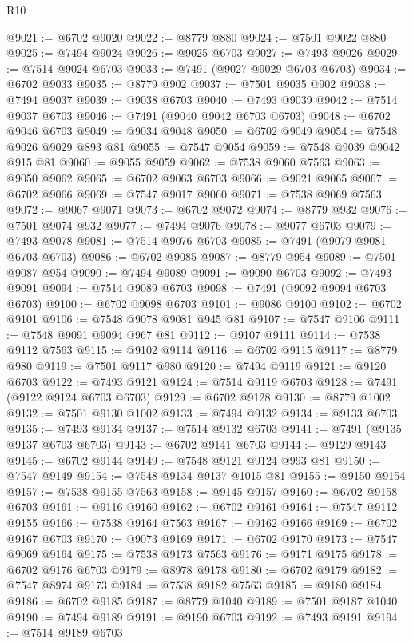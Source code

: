 \begin{lexlean}{R10}
\begin{coremodule}
{{{{{{{{{{{{{{{{{{{{{{{{{{{{{{{{{{{{{{{{{{{{{{{{{{{{{{{{{{{{{{{{{{{{{{{{{{{{{{{{{{{{@9021 := @6702 @9020
@9022 := @8779 @880
@9024 := @7501 @9022 @880
@9025 := @7494 @9024
@9026 := @9025 @6703
@9027 := @7493 @9026
@9029 := @7514 @9024 @6703
@9033 := @7491 (@9027 @9029 @6703 @6703)
@9034 := @6702 @9033
@9035 := @8779 @902
@9037 := @7501 @9035 @902
@9038 := @7494 @9037
@9039 := @9038 @6703
@9040 := @7493 @9039
@9042 := @7514 @9037 @6703
@9046 := @7491 (@9040 @9042 @6703 @6703)
@9048 := @6702 @9046 @6703
@9049 := @9034 @9048
@9050 := @6702 @9049
@9054 := @7548 @9026 @9029 @893 @81
@9055 := @7547 @9054
@9059 := @7548 @9039 @9042 @915 @81
@9060 := @9055 @9059
@9062 := @7538 @9060 @7563
@9063 := @9050 @9062
@9065 := @6702 @9063 @6703
@9066 := @9021 @9065
@9067 := @6702 @9066
@9069 := @7547 @9017 @9060
@9071 := @7538 @9069 @7563
@9072 := @9067 @9071
@9073 := @6702 @9072
@9074 := @8779 @932
@9076 := @7501 @9074 @932
@9077 := @7494 @9076
@9078 := @9077 @6703
@9079 := @7493 @9078
@9081 := @7514 @9076 @6703
@9085 := @7491 (@9079 @9081 @6703 @6703)
@9086 := @6702 @9085
@9087 := @8779 @954
@9089 := @7501 @9087 @954
@9090 := @7494 @9089
@9091 := @9090 @6703
@9092 := @7493 @9091
@9094 := @7514 @9089 @6703
@9098 := @7491 (@9092 @9094 @6703 @6703)
@9100 := @6702 @9098 @6703
@9101 := @9086 @9100
@9102 := @6702 @9101
@9106 := @7548 @9078 @9081 @945 @81
@9107 := @7547 @9106
@9111 := @7548 @9091 @9094 @967 @81
@9112 := @9107 @9111
@9114 := @7538 @9112 @7563
@9115 := @9102 @9114
@9116 := @6702 @9115
@9117 := @8779 @980
@9119 := @7501 @9117 @980
@9120 := @7494 @9119
@9121 := @9120 @6703
@9122 := @7493 @9121
@9124 := @7514 @9119 @6703
@9128 := @7491 (@9122 @9124 @6703 @6703)
@9129 := @6702 @9128
@9130 := @8779 @1002
@9132 := @7501 @9130 @1002
@9133 := @7494 @9132
@9134 := @9133 @6703
@9135 := @7493 @9134
@9137 := @7514 @9132 @6703
@9141 := @7491 (@9135 @9137 @6703 @6703)
@9143 := @6702 @9141 @6703
@9144 := @9129 @9143
@9145 := @6702 @9144
@9149 := @7548 @9121 @9124 @993 @81
@9150 := @7547 @9149
@9154 := @7548 @9134 @9137 @1015 @81
@9155 := @9150 @9154
@9157 := @7538 @9155 @7563
@9158 := @9145 @9157
@9160 := @6702 @9158 @6703
@9161 := @9116 @9160
@9162 := @6702 @9161
@9164 := @7547 @9112 @9155
@9166 := @7538 @9164 @7563
@9167 := @9162 @9166
@9169 := @6702 @9167 @6703
@9170 := @9073 @9169
@9171 := @6702 @9170
@9173 := @7547 @9069 @9164
@9175 := @7538 @9173 @7563
@9176 := @9171 @9175
@9178 := @6702 @9176 @6703
@9179 := @8978 @9178
@9180 := @6702 @9179
@9182 := @7547 @8974 @9173
@9184 := @7538 @9182 @7563
@9185 := @9180 @9184
@9186 := @6702 @9185
@9187 := @8779 @1040
@9189 := @7501 @9187 @1040
@9190 := @7494 @9189
@9191 := @9190 @6703
@9192 := @7493 @9191
@9194 := @7514 @9189 @6703
}}}}}}}}}}}}}}}}}}}}}}}}}}}}}}}}}}}}}}}}}}}}}}}}}}}}}}}}}}}}}}}}}}}}}}}}}}}}}}}}}}}}
\end{coremodule}
\end{lexlean}

